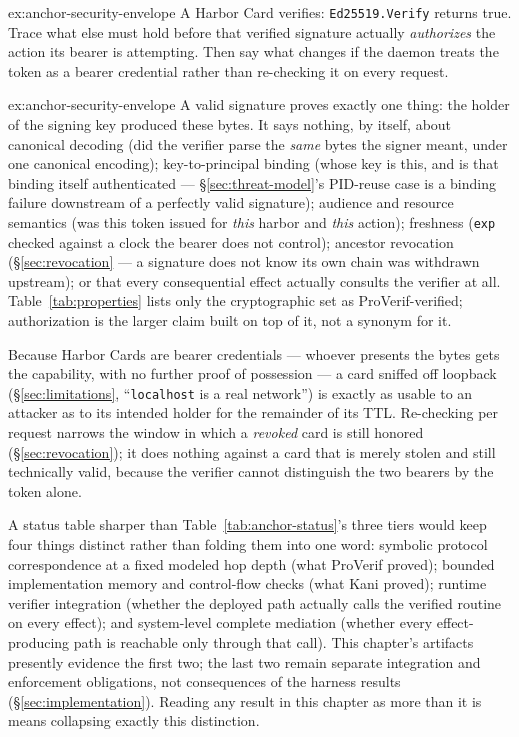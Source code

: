 \documentclass[11pt,a4paper]{article}
\theoremstyle{definition}
\begin{document}
\begin{pdexercise}[kind=Trace,rating=2]{ex:anchor-security-envelope}
A Harbor Card verifies: \texttt{Ed25519.Verify} returns true. Trace what else must hold before that verified signature actually \emph{authorizes} the action its bearer is attempting. Then say what changes if the daemon treats the token as a bearer credential rather than re-checking it on every request.
\end{pdexercise}
\begin{pdsolution}{ex:anchor-security-envelope}
A valid signature proves exactly one thing: the holder of the signing key produced these bytes. It says nothing, by itself, about canonical decoding (did the verifier parse the \emph{same} bytes the signer meant, under one canonical encoding); key-to-principal binding (whose key is this, and is that binding itself authenticated --- \S\ref{sec:threat-model}'s PID-reuse case is a binding failure downstream of a perfectly valid signature); audience and resource semantics (was this token issued for \emph{this} harbor and \emph{this} action); freshness (\texttt{exp} checked against a clock the bearer does not control); ancestor revocation (\S\ref{sec:revocation} --- a signature does not know its own chain was withdrawn upstream); or that every consequential effect actually consults the verifier at all. Table~\ref{tab:properties} lists only the cryptographic set as ProVerif-verified; authorization is the larger claim built on top of it, not a synonym for it.

Because Harbor Cards are bearer credentials --- whoever presents the bytes gets the capability, with no further proof of possession --- a card sniffed off loopback (\S\ref{sec:limitations}, ``\texttt{localhost} is a real network'') is exactly as usable to an attacker as to its intended holder for the remainder of its TTL. Re-checking per request narrows the window in which a \emph{revoked} card is still honored (\S\ref{sec:revocation}); it does nothing against a card that is merely stolen and still technically valid, because the verifier cannot distinguish the two bearers by the token alone.

A status table sharper than Table~\ref{tab:anchor-status}'s three tiers would keep four things distinct rather than folding them into one word: symbolic protocol correspondence at a fixed modeled hop depth (what ProVerif proved); bounded implementation memory and control-flow checks (what Kani proved); runtime verifier integration (whether the deployed path actually calls the verified routine on every effect); and system-level complete mediation (whether every effect-producing path is reachable only through that call). This chapter's artifacts presently evidence the first two; the last two remain separate integration and enforcement obligations, not consequences of the harness results (\S\ref{sec:implementation}). Reading any result in this chapter as more than it is means collapsing exactly this distinction.
\end{pdsolution}
\end{document}
